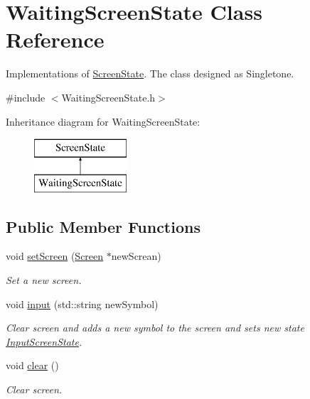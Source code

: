 \hypertarget{class_waiting_screen_state}{}\section{Waiting\+Screen\+State Class Reference}
\label{class_waiting_screen_state}


Implementations of \hyperlink{class_screen_state}{Screen\+State}. The class designed as Singletone.~\newline
  




{\ttfamily \#include $<$Waiting\+Screen\+State.\+h$>$}

Inheritance diagram for Waiting\+Screen\+State\+:\begin{figure}[H]
\begin{center}
\leavevmode
\includegraphics[height=2.000000cm]{class_waiting_screen_state}
\end{center}
\end{figure}
\subsection*{Public Member Functions}
\begin{DoxyCompactItemize}
\item 
void \hyperlink{class_waiting_screen_state_a35c29d113f4110d165fffdfe6ef1a57c}{set\+Screen} (\hyperlink{class_screen}{Screen} $\ast$new\+Screan)
\begin{DoxyCompactList}\small\item\em Set a new screen. \end{DoxyCompactList}\item 
void \hyperlink{class_waiting_screen_state_ac22e314bd11df4ba4d5480da022f5862}{input} (std\+::string new\+Symbol)
\begin{DoxyCompactList}\small\item\em Clear screen and adds a new symbol to the screen and sets new state \hyperlink{class_input_screen_state}{Input\+Screen\+State}. \end{DoxyCompactList}\item 
\hypertarget{class_waiting_screen_state_aa411b1a427f9a112ddaaff80105bbaff}{}void \hyperlink{class_waiting_screen_state_aa411b1a427f9a112ddaaff80105bbaff}{clear} ()\label{class_waiting_screen_state_aa411b1a427f9a112ddaaff80105bbaff}

\begin{DoxyCompactList}\small\item\em Clear screen. \end{DoxyCompactList}\end{DoxyCompactItemize}
